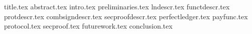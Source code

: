 \documentclass{llncs}
\begin{document}
\pagestyle{plain}
{title.tex}
{abstract.tex}
{intro.tex}
{preliminaries.tex}
{lndescr.tex}
{functdescr.tex}
{protdescr.tex}
{combsigndescr.tex}
{secproofdescr.tex}
{perfectledger.tex}
{payfunc.tex}
{protocol.tex}
{secproof.tex}
{futurework.tex}
{conclusion.tex}



\end{document}
